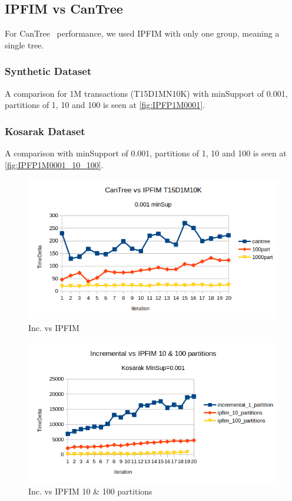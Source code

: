 \subsection{IPFIM vs CanTree}
For CanTree~\cite{leung2005cantree} performance, we used IPFIM with only one group, meaning a single tree.

\subsubsection{Synthetic Dataset}
A comparison for 1M transactions (T15D1MN10K) with minSupport of 0.001, partitions of 1, 10 and 100 is seen at \autoref{fig:IPFP1M0001}.

\subsubsection{Kosarak Dataset}
A comparison with minSupport of 0.001, partitions of 1, 10 and 100 is seen at \autoref{fig:IPFP1M0001_10_100}.


\begin{figure}
  \centering
  \includegraphics[width=\linewidth]{figures/IPFP1M0001}
  \caption{Inc. vs IPFIM}
  \label{fig:IPFP1M0001}
\end{figure}

\begin{figure}[h!]
  \centering
  \includegraphics[width=\linewidth]{figures/IPFIM_1_10_100_part_kosarak}
  \caption{Inc. vs IPFIM 10 \& 100 partitions}
  \label{fig:IPFP1M0001_10_100}
\end{figure}


